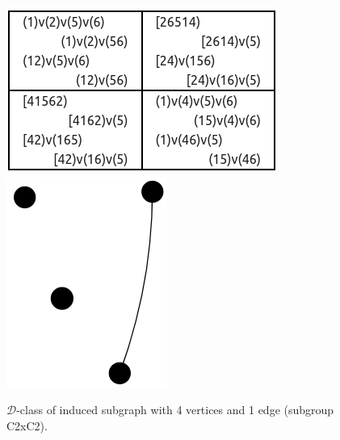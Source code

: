 \begin{appendices}
\begin{figure}[H]
\includegraphics[scale=0.3]{images/x1/x1_4v_1e.png}
\includegraphics[scale=0.2]{images/x1/x1_4v_1e_vis.png}
\caption{$\mathcal{D}$-class of induced subgraph with 4 vertices and 1 edge (subgroup C2xC2).}
\end{figure}


\end{appendices}

